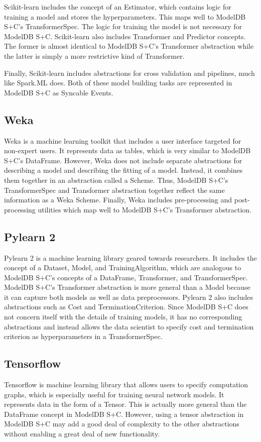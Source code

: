 Scikit-learn includes the concept of an Estimator, which contains logic for training a model and stores the hyperparameters.
This maps well to ModelDB S+C's TransformerSpec. The logic for training the model is not necessary for ModelDB S+C. Scikit-learn
also includes Transformer and Predictor concepts. The former is almost identical to ModelDB S+C's Transformer abstraction while the 
latter is simply a more restrictive kind of Transformer.

Finally, Scikit-learn includes abstractions for cross validation and pipelines, much like Spark.ML does. Both of these
model building tasks are represented in ModelDB S+C as Syncable Events.

\subsection{Weka}
Weka \cite{weka} is a machine learning toolkit that includes a user interface targeted for non-expert users.
It represents data as tables, which is very similar to ModelDB S+C's DataFrame.
However, Weka does not include separate abstractions for describing a model and describing the fitting of a model. Instead,
it combines them together in an abstraction called a Scheme. Thus, ModelDB S+C's TransformerSpec and Transformer abstraction
together reflect the same information as a Weka Scheme. Finally, Weka includes pre-processing and post-processing utilities which
map well to ModelDB S+C's Transformer abstraction.

\subsection{Pylearn 2}
Pylearn 2 \cite{pylearn2} is a machine learning library geared towards researchers. It includes the concept of a Dataset, Model,
and TrainingAlgorithm, which are analogous to ModelDB S+C's concepts of a DataFrame, Transformer, and TransformerSpec.
ModelDB S+C's Transformer abstraction is more general than a Model because it can capture both models as well as data preprocessors.
Pylearn 2 also includes abstractions such as Cost and TerminationCriterion. Since ModelDB S+C does not concern itself with the
details of training models, it has no corresponding abstractions and instead allows the data scientist to specify cost and termination criterion
as hyperparameters in a TransformerSpec.

\subsection{Tensorflow}
Tensorflow \cite{tensorflow} is machine learning library that allows users to specify computation graphs, which is
especially useful for training neural network models. It represents data in the form of a Tensor. 
This is actually more general than the DataFrame concept in ModelDB S+C. However, using a tensor abstraction in ModelDB S+C may
add a good deal of complexity to the other abstractions without enabling a great deal of new functionality. 

